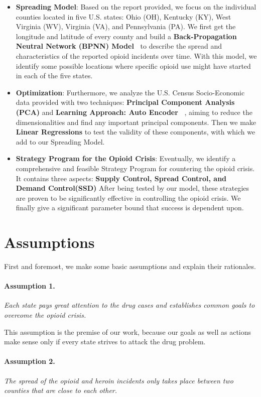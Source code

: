 \documentclass{mcmthesis}
\begin{document}
\begin{itemize}
\item \textbf{Spreading Model}: Based on the report provided, we focus on the individual counties located in five U.S. states: Ohio (OH), Kentucky (KY), West Virginia (WV), Virginia (VA), and Pennsylvania (PA). We first get the longitude and latitude of every county and build a \textbf{Back-Propagation Neutral Network (BPNN) Model~\cite{NURCIN2017417}} to describe the spread and characteristics of the reported opioid incidents over time. With this model, we identify some possible locations where specific opioid use might have started in each of the five states.
\item \textbf{Optimization}: Furthermore, we analyze the U.S. Census Socio-Economic data provided with two techniques:   \textbf{Principal Component Analysis (PCA)} and \textbf{Learning Approach: Auto Encoder~\cite{NURCIN2017417}} ,  aiming to reduce the dimensionalities and find any important principal components. Then we make \textbf{Linear Regressions} to test the validity of these components, with which we add to our Spreading Model.
\item \textbf{Strategy Program for the Opioid Crisis}: Eventually, we identify a comprehensive and feasible Strategy Program for countering the opioid crisis. It contains three aspects: \textbf{Supply Control, Spread Control, and Demand Control(SSD)} After being tested by our model, these strategies are proven to be significantly effective in controlling the opioid crisis. We finally give a significant parameter bound that success is dependent upon.
\end{itemize}

\section{Assumptions}\label{Sec-Assume}
First and foremost, we make some basic assumptions and explain their rationales.
	\paragraph{Assumption 1.}\itshape{Each state pays great attention to the drug cases and establishes common goals to overcome the opioid crisis.}
	
	\upshape This assumption is the premise of our work, because our goals as well as actions make sense only if every state strives to attack the drug problem.
	
	\paragraph{Assumption 2.}\itshape{The spread of the opioid and heroin incidents only takes place between two counties that are close to each other.}
	
\end{document}
